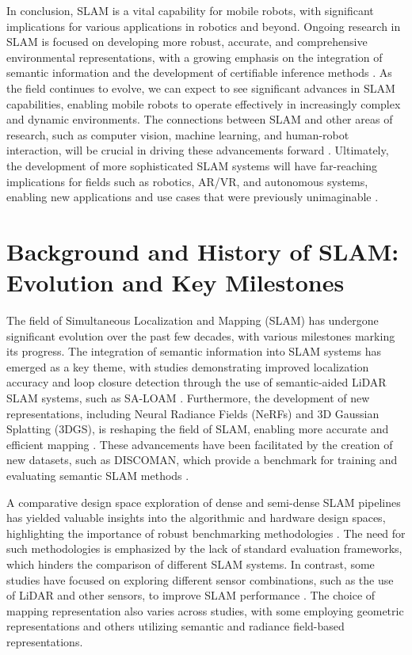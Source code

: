 \documentclass[conference]{IEEEtran}
\begin{document}
In conclusion, SLAM is a vital capability for mobile robots, with significant implications for various applications in robotics and beyond. Ongoing research in SLAM is focused on developing more robust, accurate, and comprehensive environmental representations, with a growing emphasis on the integration of semantic information and the development of certifiable inference methods \cite{b13}. As the field continues to evolve, we can expect to see significant advances in SLAM capabilities, enabling mobile robots to operate effectively in increasingly complex and dynamic environments. The connections between SLAM and other areas of research, such as computer vision, machine learning, and human-robot interaction, will be crucial in driving these advancements forward \cite{b14}. Ultimately, the development of more sophisticated SLAM systems will have far-reaching implications for fields such as robotics, AR/VR, and autonomous systems, enabling new applications and use cases that were previously unimaginable \cite{b15}.

\section{Background and History of SLAM: Evolution and Key Milestones}
The field of Simultaneous Localization and Mapping (SLAM) has undergone significant evolution over the past few decades, with various milestones marking its progress. The integration of semantic information into SLAM systems has emerged as a key theme, with studies demonstrating improved localization accuracy and loop closure detection through the use of semantic-aided LiDAR SLAM systems, such as SA-LOAM \cite{b1}. Furthermore, the development of new representations, including Neural Radiance Fields (NeRFs) and 3D Gaussian Splatting (3DGS), is reshaping the field of SLAM, enabling more accurate and efficient mapping \cite{b2}. These advancements have been facilitated by the creation of new datasets, such as DISCOMAN, which provide a benchmark for training and evaluating semantic SLAM methods \cite{b3}.

A comparative design space exploration of dense and semi-dense SLAM pipelines has yielded valuable insights into the algorithmic and hardware design spaces, highlighting the importance of robust benchmarking methodologies \cite{b4}. The need for such methodologies is emphasized by the lack of standard evaluation frameworks, which hinders the comparison of different SLAM systems. In contrast, some studies have focused on exploring different sensor combinations, such as the use of LiDAR and other sensors, to improve SLAM performance \cite{b5}. The choice of mapping representation also varies across studies, with some employing geometric representations and others utilizing semantic and radiance field-based representations.
\end{document}
